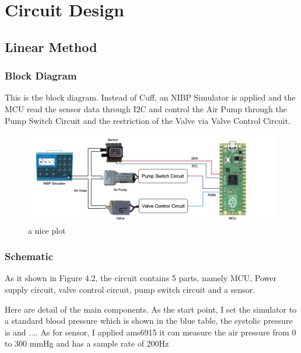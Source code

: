 \chapter{Circuit Design}
\label{chap:10}

\section{Linear Method}
\subsection{Block Diagram}
This is the block diagram. Instead of Cuff, an NIBP Simulator is applied and the MCU read the sensor data through I2C and control the Air Pump through the Pump Switch Circuit and the restriction of the Valve via Valve Control Circuit. 

\begin{figure}[h]
    \centering 
    \captionsetup{justification=centering}
    \includegraphics[width=\textwidth]{img/blockdiagram_lin.png}
    \caption{a nice plot}
    \label{fig:mesh1}
\end{figure}

\subsection{Schematic}
As it shown in Figure 4.2, the circuit contains 5 parts, namely MCU, Power supply circuit, valve control circuit, pump switch circuit and a sensor. 

Here are detail of the main components. As the start point, I set the simulator to a standard blood pressure which is shown in the blue table, the systolic pressure is and .... As for sensor, I applied ams6915 it can measure the air pressure from 0 to 300 mmHg and has a sample rate of 200Hz

